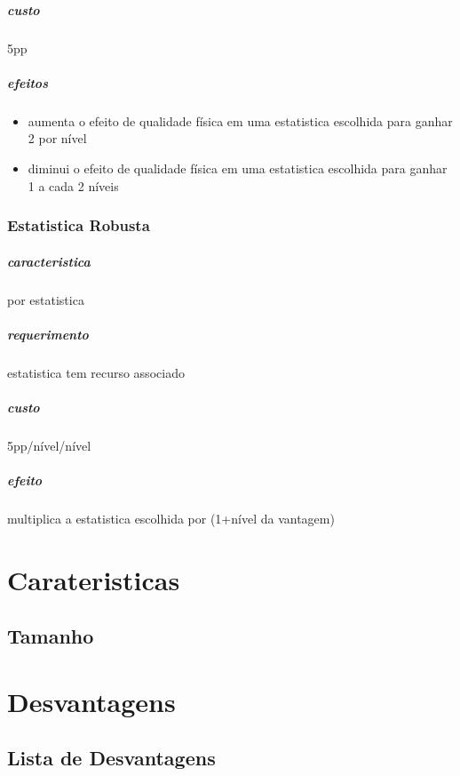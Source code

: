 \paragraph{custo} 5pp
\paragraph{efeitos}
\begin{itemize}
  \item aumenta o efeito de qualidade física em uma estatistica escolhida para ganhar 2 por nível
  \item diminui o efeito de qualidade física em uma estatistica escolhida para ganhar 1 a cada 2 níveis
\end{itemize}
%
\subsection{Estatistica Robusta}
\paragraph{caracteristica} por estatistica
\paragraph{requerimento} estatistica tem recurso associado
\paragraph{custo} 5pp/nível/nível
\paragraph{efeito} multiplica a estatistica escolhida por (1+nível da vantagem)
%
%
%
%
\chapter{Carateristicas}
\section{Tamanho}

%
%
%
%
\chapter{Desvantagens}
\section{Lista de Desvantagens}
